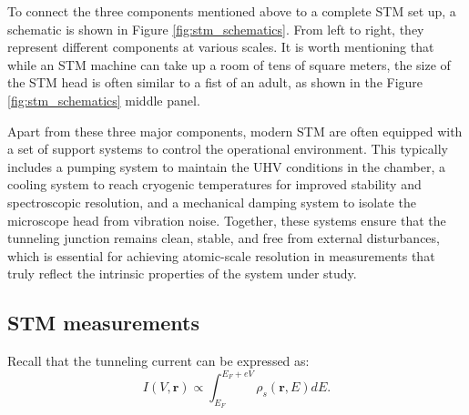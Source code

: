 To connect the three components mentioned above to a complete \ac{STM} set up, a schematic is shown in Figure \ref{fig:stm_schematics}. From left to right, they represent different components at various scales. It is worth mentioning that while an \ac{STM} machine can take up a room of tens of square meters, the size of the \ac{STM} head is often similar to a fist of an adult, as shown in the Figure \ref{fig:stm_schematics} middle panel.

Apart from these three major components, modern \ac{STM} are often equipped with a set of support systems to control the operational environment. This typically includes a pumping system to maintain the UHV conditions in the chamber, a cooling system to reach cryogenic temperatures for improved stability and spectroscopic resolution, and a mechanical damping system to isolate the microscope head from vibration noise. Together, these systems ensure that the tunneling junction remains clean, stable, and free from external disturbances, which is essential for achieving atomic-scale resolution in measurements that truly reflect the intrinsic properties of the system under study.  

\subsection{\ac{STM} measurements}

Recall that the tunneling current can be expressed as:  
\begin{equation}
	I(V,\mathbf{r}) \propto \int_{E_F}^{E_F+eV}\rho_s(\mathbf{r},E)dE. 
\end{equation}

